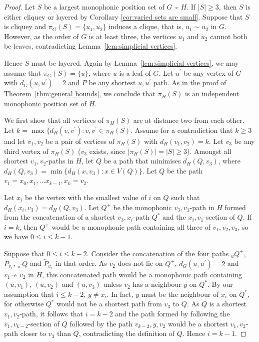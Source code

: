 \documentclass[10pt,a4paper]{amsart}
\DeclareMathOperator{\cp}{\,\square\,}
\begin{document}
\begin{proof} 
Let $S$ be a largest monophonic position set of $G\cp H$. If $|S|\geq 3$, then $S$ is either cliquey or layered by Corollary \ref{cor:varied sets are small}. Suppose that $S$ is cliquey and $\pi_G(S)=\{u_1, u_2\}$ induces a clique, that is, $u_1\sim u_2$ in $G$. However, as the order of $G$ is at least three, the vertices $u_1$ and $u_2$ cannot both be leaves, contradicting Lemma~\ref{lem:simplicial vertices}. 

Hence $S$ must be layered. Again by Lemma~\ref{lem:simplicial vertices}, we may assume that $\pi_G(S)=\{u\}$, where $u$ is a leaf of $G$. Let $u^{\prime }$ be any vertex of $G$ with $d_G(u,u^{\prime }) = 2$ and $P$ be any shortest $u,u^{\prime }$ path. As in the proof of Theorem~\ref{thm:general bounds}, we conclude that $\pi_H(S)$ is an independent monophonic position set of $H$. 

We first show that all vertices of $\pi _H(S)$ are at distance two from each other. Let $k = \max \{ d_H(v,v^{\prime }):v,v^{\prime } \in \pi _H(S)$. Assume for a contradiction that $k \geq 3$ and let $v_1,v_2$ be a pair of vertices of $\pi _H(S)$ with $d_H(v_1,v_2) = k$. Let $v_3$ be any third vertex of $\pi _H(S)$ ($v_3$ exists, since $|\pi _H(S)| = |S| \geq 3$). Amongst all shortest $v_1,v_2$-paths in $H$, let $Q$ be a path that minimises $d_H(Q,v_3)$, where $d_H(Q,v_3) = \min \{ d_H(x,v_3):x \in V(Q)\} $. Let $Q$ be the path $v_1 = x_0,x_1,\dots x_{k-1},x_k = v_2$. 

Let $x_i$ be the vertex with the smallest value of $i$ on $Q$ such that $d_H(x_i,v_3) = d_H(Q,v_3)$. Let $Q^+$ be the monophonic $v_3,v_1$-path in $H$ formed from the concatenation of a shortest $v_3,x_i$-path $Q^*$ and the $x_i,v_1$-section of $Q$. If $i = k$, then $Q^+$ would be a monophonic path containing all three of $v_1,v_2,v_3$, so we have $0 \leq i \leq k-1$.   

Suppose that $0 \leq i \leq k-2$. Consider the concatenation of the four paths $_uQ^+$, $P_{v_1}$, $_{u^{\prime }}Q$ and $\widetilde{P}_{v_2}$ in that order. As $v_2$ does not lie on $Q^+$, $d_G(u,u^{\prime }) = 2$ and $v_1 \not \sim v_2$ in $H$, this concatenated path would be a monophonic path containing $(u,v_1)$, $(u,v_2)$ and $(u,v_3)$ unless $v_2$ has a neighbour $y$ on $Q^*$. By our assumption that $i \leq k-2$, $y \neq x_i$. In fact, $y$ must be the neighbour of $x_i$ on $Q^*$, for otherwise $Q^*$ would not be a shortest path from $v_3$ to $Q$. As $Q$ is a shortest $v_1,v_2$-path, it follows that $i = k-2$ and the path formed by following the $v_1,v_{k-2}$-section of $Q$ followed by the path $v_{k-2},y,v_2$ would be a shortest $v_1,v_2$-path closer to $v_3$ than $Q$, contradicting the definition of $Q$. Hence $i = k-1$.   


\end{proof}
\end{document}
